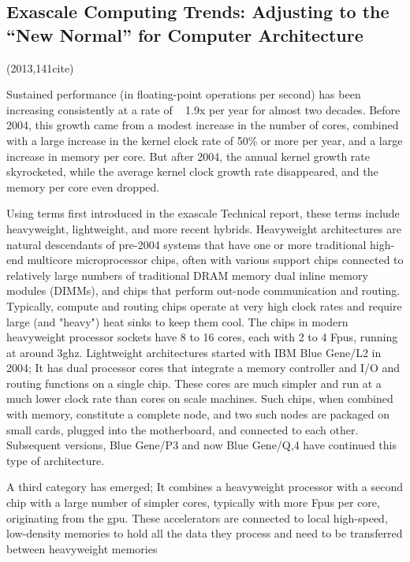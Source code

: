 \documentclass[a4paper,twoside]{scrbook}
\begin{document}
\par
\subsection{Exascale Computing Trends: Adjusting to the “New Normal” for Computer Architecture \cite{kogge2013exascale}}
(2013,141cite)\par
Sustained performance (in floating-point operations per second) has been increasing consistently at a rate of ~ 1.9x per year for almost two decades.
Before 2004, this growth came from a modest increase in the number of cores, combined with a large increase in the kernel clock rate of 50\% or more per year, and a large increase in memory per core. But after 2004, the annual kernel growth rate skyrocketed, while the average kernel clock growth rate disappeared, and the memory per core even dropped.
\par
Using terms first introduced in the exascale Technical report, these terms include heavyweight, lightweight, and more recent hybrids.
Heavyweight architectures are natural descendants of pre-2004 systems that have one or more traditional high-end multicore microprocessor chips, often with various support chips connected to relatively large numbers of traditional DRAM memory dual inline memory modules (DIMMs), and chips that perform out-node communication and routing. Typically, compute and routing chips operate at very high clock rates and require large (and "heavy") heat sinks to keep them cool. The chips in modern heavyweight processor sockets have 8 to 16 cores, each with 2 to 4 Fpus, running at around 3ghz.
Lightweight architectures started with IBM Blue Gene/L2 in 2004; It has dual processor cores that integrate a memory controller and I/O and routing functions on a single chip. These cores are much simpler and run at a much lower clock rate than cores on scale machines. Such chips, when combined with memory, constitute a complete node, and two such nodes are packaged on small cards, plugged into the motherboard, and connected to each other. Subsequent versions, Blue Gene/P3 and now Blue Gene/Q,4 have continued this type of architecture.

A third category has emerged; It combines a heavyweight processor with a second chip with a large number of simpler cores, typically with more Fpus per core, originating from the gpu. These accelerators are connected to local high-speed, low-density memories to hold all the data they process and need to be transferred between heavyweight memories
\end{document}
